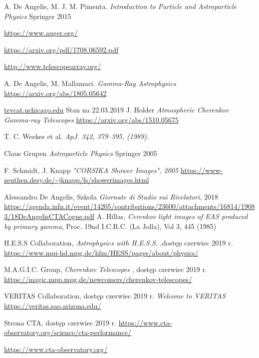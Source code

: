 \documentclass[a4paper,11pt,twoside]{article}
\begin{document}
\newpage

\begin{thebibliography}{9}
A. De Angelis, M. J. M. Pimenta.
\textit{Introduction to Particle and Astroparticle Physics} Springer 2015

\url{https://www.auger.org/}

\url{https://arxiv.org/pdf/1708.06592.pdf}

\url{http://www.telescopearray.org/}

A. De Angelis, M. Mallamaci.
\textit{Gamma-Ray Astrophysics} 
\url{https://arxiv.org/abs/1805.05642}

\url{tevcat.uchicago.edu}
Stan na 22.03.2019
J. Holder
\textit{Atmospheric Cherenkov Gamma-ray Telescopes}
\url{https://arxiv.org/abs/1510.05675}

T. C. Weekes et al.
\textit{ApJ. 342, 379–395, (1989).}

Claus Grupen
\textit{Astroparticle Physics} Springer 2005

F. Schmidt, J. Knapp
\textit{"CORSIKA Shower Images", 2005}
\url{https://www-zeuthen.desy.de/~jknapp/fs/showerimages.html}

Alessandro De Angelis, Szkoła \textsl{
Giornate di Studio sui Rivelatori}, 2018 
\url{https://agenda.infn.it/event/14205/contributions/23600/attachments/16814/19083/18DeAngelisCTACogne.pdf}
A. Hillas, 
\textit{Cerenkov light images of EAS produced by primary gamma},
Proc. 19nd I.C.R.C. (La Jolla), Vol 3, 445 (1985)

H.E.S.S  Collaboration,
\textit{Astrophysics with H.E.S.S.}
,dostęp czerwiec 2019 r. 
\url{https://www.mpi-hd.mpg.de/hfm/HESS/pages/about/physics/}

 M.A.G.I.C.  Group,
\textit{Cherenkov Telescopes}
, dostęp czerwiec 2019 r. 
\url{https://magic.mpp.mpg.de/newcomers/cherenkov-telescopes/}

VERITAS Collaboration, dostęp czerwiec 2019 r. 
\textit{Welcome to VERITAS }
\url{https://veritas.sao.arizona.edu/}

Strona CTA, dostęp czerwiec 2019 r.
\url{https://www.cta-observatory.org/science/cta-performance/}

\url{https://www.cta-observatory.org/}


\end{thebibliography}
\end{document}
